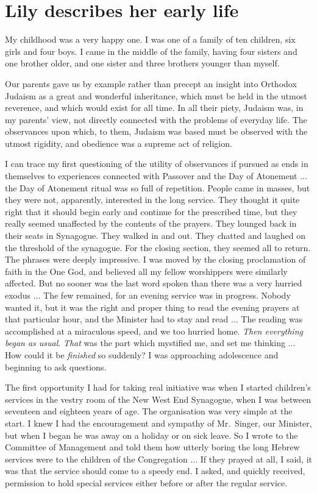 \documentclass[14pt, article, extrafontsizes, twopage, a4paper]{memoir}
\begin{document}
\clearpage
\chapter{Lily describes her early life}

My childhood was a very happy one. I was one of a
family of ten children, six girls and four boys. I came in
the middle of the family, having four sisters and one
brother older, and one sister and three brothers younger
than myself.

Our parents gave us by example rather than precept
an insight into Orthodox Judaism as a great and wonderful
inheritance, which must be held in the utmost reverence,
and which would exist for all time. In all their
piety, Judaism was, in my parents’ view, not directly connected
with the problems of everyday life. The observances
upon which, to them, Judaism was based must be
observed with the utmost rigidity, and obedience was a
supreme act of religion.

I can trace my first questioning of the utility of
observances if pursued as ends in themselves to experiences
connected with Passover and the Day of Atonement ... 
the Day of Atonement ritual was so full of
repetition. People came in masses, but they were not,
apparently, interested in the long service. They thought
it quite right that it should begin early and continue for
the prescribed time, but they really seemed unaffected by
the contents of the prayers. They lounged back in their
seats in Synagogue. They walked in and out. They
chatted and laughed on the threshold of the synagogue.
For the closing section, they seemed all to return. The
phrases were deeply impressive. I was moved by the
closing proclamation of faith in the One God, and
believed all my fellow worshippers were similarly
affected.
But no sooner was the last word spoken than there
was a very hurried exodus ... The few
remained, for an evening service was in progress. Nobody
wanted it, but it was the right and proper thing to read
the evening prayers at that particular hour, and the
Minister had to stay and read ... The reading was accomplished
at a miraculous speed, and we too hurried home. \textsl{Then
everything began as usual}. \textsl{That} was the part which
mystified me, and set me thinking ... How could it be \textsl{finished}
so suddenly? I was approaching adolescence and beginning
to ask questions.

The first opportunity I had for taking real initiative
was when I started children’s services in the vestry room
of the New West End Synagogue, when I was between
seventeen and eighteen years of age. The organisation
was very simple at the start. I knew I had the encouragement
and sympathy of Mr.\ Singer, our Minister, but
when I began he was away on a holiday or on sick leave.
So I wrote to the Committee of Management and told them
how utterly boring the long Hebrew services were to the
children of the Congregation ... If they prayed at all, I said, it was that the service should
come to a speedy end. I asked, and quickly received,
permission to hold special services either before or after
the regular service.
\end{document}
